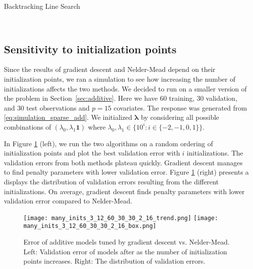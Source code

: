 \documentclass[12pt,letterpaper]{article}
\begin{document}
\begin{algorithm}
\caption{Backtracking Line Search}
\label{alg:backtracking}
         \begin{algorithmic}
  	 \\
	\ENDWHILE
	\end{algorithmic}
\end{algorithm}

\subsection{Sensitivity to initialization points}
Since the results of gradient descent and Nelder-Mead depend on their initialization points, we ran a simulation to see how increasing the number of initializations affects the two methods. We decided to run on a smaller version of the problem in  Section~\ref{sec:additive}. Here we have 60 training, 30 validation, and 30 test observations and $p = 15$ covariates. The response was generated from \eqref{eq:simulation_sparse_add}. We initialized $\boldsymbol{\lambda}$ by considering all possible combinations of $(\lambda_0, \lambda_1 \boldsymbol{1})$ where $\lambda_0, \lambda_1 \in \{10^i: i\in\{-2, -1, 0, 1\}\}$.

In Figure \ref{fig:mult_starts} (left), we run the two algorithms on a random ordering of initialization points and plot the best validation error with $i$ initializations. The validation errors from both methods plateau quickly. Gradient descent manages to find penalty parameters with lower validation error. Figure \ref{fig:mult_starts} (right) presents a displays the distribution of validation errors resulting from the different initializations. On average, gradient descent finds penalty parameters with lower validation error compared to Nelder-Mead.
\begin{figure}
	\label{fig:mult_starts}
	\caption{Error of additive models tuned by gradient descent vs. Nelder-Mead. Left: Validation error of models after as the number of initialization points increases. Right: The distribution of validation errors.
	}
	\centering
	\texttt{[image: many\_inits\_3\_12\_60\_30\_30\_2\_16\_trend.png]}
	\texttt{[image: many\_inits\_3\_12\_60\_30\_30\_2\_16\_box.png]}
\end{figure}
\end{document}
